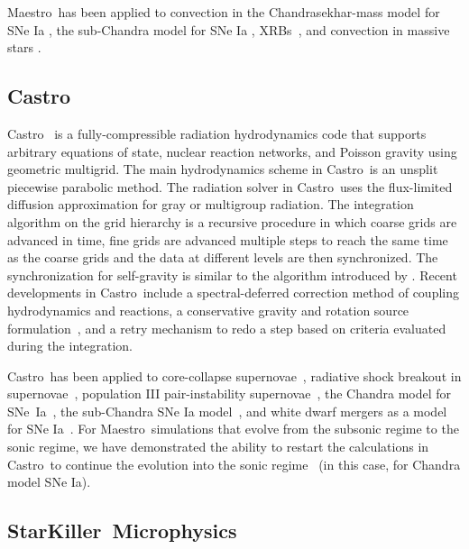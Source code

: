 \documentclass[a4paper]{jpconf}
\newcommand{\maestro}{{\sffamily Maestro}}
\newcommand{\castro}{{\sffamily Castro}}
\newcommand{\starkiller}{{\sffamily StarKiller}}
\begin{document}
\maestro\ has been applied to convection in the Chandrasekhar-mass
model for SNe Ia \cite{ZABNW:IV,wdconvect,wdturb}, the sub-Chandra
model for SNe Ia \cite{subchandra,subchandra2},
XRBs~\cite{xrb,xrb2,xrb3}, and convection in massive stars
\cite{ms_cc}.



\subsection{\castro}

\castro~\cite{castro,castroII,castroIII} is a fully-compressible
radiation hydrodynamics code that supports arbitrary equations of
state, nuclear reaction networks, and Poisson gravity using geometric
multigrid.  The main hydrodynamics scheme in \castro\ is an unsplit
piecewise parabolic method.  The radiation solver in \castro\ uses the
flux-limited diffusion approximation for gray or multigroup radiation.
The integration algorithm on the grid hierarchy is a recursive
procedure in which coarse grids are advanced in time, fine grids are
advanced multiple steps to reach the same time as the coarse grids and
the data at different levels are then synchronized. The
synchronization for self-gravity is similar to the algorithm
introduced by \cite{miniati-colella}.  Recent developments in
\castro\ include a spectral-deferred correction method of coupling
hydrodynamics and reactions, a conservative gravity and rotation
source formulation~\cite{wdmergerI}, and a retry mechanism to redo a
step based on criteria evaluated during the
integration.

\castro\ has been applied to core-collapse
supernovae~\cite{castro-ccsne}, radiative shock breakout in
supernovae~\cite{lovegrove:2017}, population III pair-instability
supernovae~\cite{castro-pairinstability}, the Chandra model for
SNe~Ia~\cite{ma:2013}, the sub-Chandra SNe Ia model~\cite{moll:2013},
and white dwarf mergers as a model for SNe
Ia~\cite{moll:2014,wdmergerI}.  For \maestro\ simulations that evolve
from the subsonic regime to the sonic regime, we have demonstrated the
ability to restart the calculations in \castro\ to continue the
evolution into the sonic regime~\cite{scidac-petascale,malone:2014}
(in this case, for Chandra model SNe Ia).

\subsection{\starkiller\ Microphysics}
\end{document}

